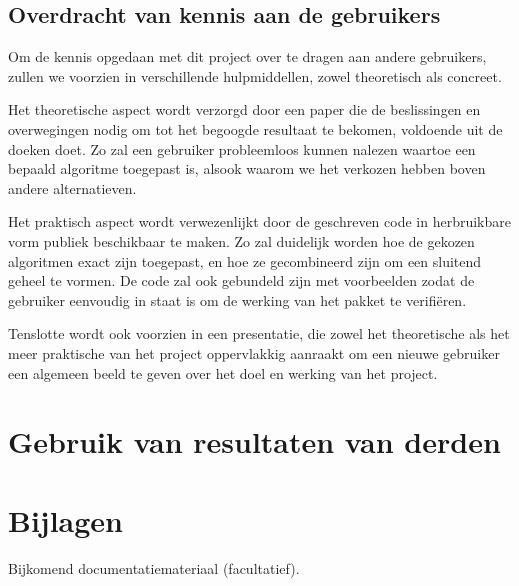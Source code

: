 \documentclass[]{book}
\begin{document}
\subsection{Overdracht van kennis aan de gebruikers}\label{sec:Overdracht}


Om de kennis opgedaan met dit project over te dragen aan andere gebruikers, zullen we voorzien in verschillende hulpmiddellen, zowel theoretisch als concreet.

Het theoretische aspect wordt verzorgd door een paper die de beslissingen en overwegingen nodig om tot het begoogde resultaat te bekomen, voldoende uit de doeken doet. Zo zal een gebruiker probleemloos kunnen nalezen waartoe een bepaald algoritme toegepast is, alsook waarom we het verkozen hebben boven andere alternatieven.

Het praktisch aspect wordt verwezenlijkt door de geschreven code in herbruikbare vorm publiek beschikbaar te maken. Zo zal duidelijk worden hoe de gekozen algoritmen exact zijn toegepast, en hoe ze gecombineerd zijn om een sluitend geheel te vormen. De code zal ook gebundeld zijn met voorbeelden zodat de gebruiker eenvoudig in staat is om de werking van het pakket te verifiëren.

Tenslotte wordt ook voorzien in een presentatie, die zowel het theoretische als het meer praktische van het project oppervlakkig aanraakt om een nieuwe gebruiker een algemeen beeld te geven over het doel en werking van het project.

\section{Gebruik van resultaten van derden}\label{sec:Gebruik}


\section{Bijlagen} \label{sec:Bijlagen}
Bijkomend documentatiemateriaal (facultatief). 
\end{document}
